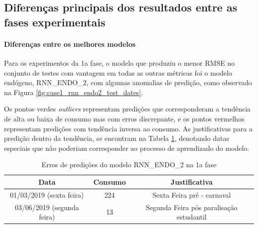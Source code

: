     \subsection{Diferenças principais dos resultados entre as fases experimentais}
        \paragraph{Diferenças entre os melhores modelos}
        Para os experimentos da 1a fase, o modelo que produziu o menor RMSE no conjunto de testes com vantagem em todas as outras métricas foi o modelo endógeno, RNN\_ENDO\_2, com algumas anomalias de predição, como observado na Figura \ref{fig:case1_rnn_endo2_test_dates}.
        \begin{figure}[H]
        \end{figure}
        Os pontos verdes \textit{outliers} representam predições que corresponderam a tendência de alta ou baixa de consumo mas com erros discrepante, e os pontos vermelhos representam predições com tendência inversa ao consumo.
        As justificativas para a predição dentro da tendência, se encontram na Tabela \ref{table:rnn_endo_2_green}, denotando datas especiais que não poderiam corresponder ao processo de aprendizado do modelo.
            \begin{table}[!ht]
                \centering
                \caption{Erros de predições do modelo RNN\_ENDO\_2 na 1a fase}
                \label{table:rnn_endo_2_green}
                 \begin{tabular}{|c|c|c|}
                 \rowcolor{gray!50}
                 \hline 
                Data & Consumo & Justificativa\\ \hline    
                01/03/2019 (sexta feira)    & 224 & Sexta Feira pré - carnaval\\
                03/06/2019 (segunda feira)  &  13 & Segunda Feira pós paralisação estudantil\\ \hline 
                \end{tabular} 
            \end{table}
            

